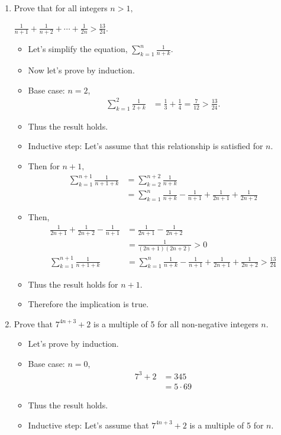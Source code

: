 \documentclass[letterpaper,12pt]{article}
\begin{document}
\begin{enumerate}
\item Prove that for all integers $n>1,$
\begin{center}
	$\frac{1}{n+1} + \frac{1}{n+2} + \cdots+\frac{1}{2n} > \frac{13}{24}$.
\end{center}
\begin{itemize}
	\item Let's simplify the equation, $\sum_{k=1}^{n}\frac{1}{n+k}$.
	\item Now let's prove by induction.
	\item Base case: $n=2$,
	\begin{align}
		\sum_{k=1}^{2}\frac{1}{2+k} &= \frac{1}{3} + \frac{1}{4}  = \frac{7}{12} > \frac{13}{24}.
	\end{align}
	\item Thus the result holds.
	\item Inductive step: Let's assume that this relationship is satisfied for $n$.
	\item Then for $n+1,$
	\begin{align}
		\sum_{k=1}^{n+1} \frac{1}{n+1+k} &= \sum_{k=2}^{n+2} \frac{1}{n+k}  
		\\&=  \sum_{k=1}^{n} \frac{1}{n+k} -\frac{1}{n+1}+\frac{1}{2n+1}+\frac{1}{2n+2}
	\end{align}
	\item Then,
	\begin{align}
		\frac{1}{2n+1}+\frac{1}{2n+2} -\frac{1}{n+1} &= \frac{1}{2n+1}-\frac{1}{2n+2}\\ &=\frac{1}{(2n+1)(2n+2)	}>0\\ \sum_{k=1}^{n+1} \frac{1}{n+1+k} &= \sum_{k=1}^{n} \frac{1}{n+k} -\frac{1}{n+1}+\frac{1}{2n+1}+\frac{1}{2n+2} > \frac{13}{24}
	\end{align}
	\item Thus the result holds for $n+1$.
	\item Therefore the implication is true.
\end{itemize}
	\item Prove that $7^{4n+3}+2$ is a multiple of 5 for all non-negative integers $n$.
	\begin{itemize}
		\item Let's prove by induction.
		\item Base case: $n=0$,
		\begin{align}
			7^3+2 &= 345 \\ &=5 \cdot 69
		\end{align}
	\item Thus the result holds.
	\item Inductive step: Let's assume that $7^{4n+3} +2 $ is a multiple of 5 for $n$.

\end{itemize}
\end{enumerate}
\end{document}
